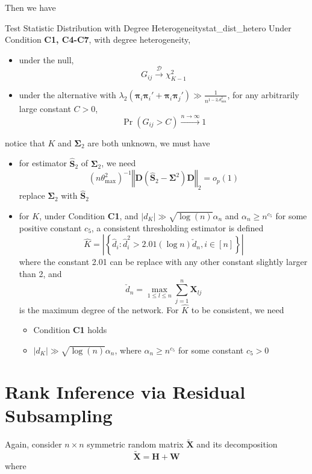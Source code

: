 \documentclass[twoside]{article}
\begin{document}
Then we have 
\begin{theorem}{Test Statistic Distribution with Degree Heterogeneity}{stat_dist_hetero}
    Under Condition \textbf{C1, C4-C7}, with degree heterogeneity, 
    \begin{itemize}
        \item under the null, $$ G_{ij} \xrightarrow{\mathcal{D}} \chi^2_{K-1} $$
        \item under the alternative with $\lambda_2 \left(\boldsymbol{\pi}_i\boldsymbol{\pi}_i' + \boldsymbol{\pi}_i \boldsymbol{\pi}_j'\right) \gg \frac{1}{n^{1-2_c\theta^2_{\min}}}$, for any arbitrarily large constant $C>0$, $$ \Pr(G_{ij}>C)\xrightarrow{n\rightarrow\infty} 1 $$
    \end{itemize}
\end{theorem}
notice that $K$ and $\boldsymbol{\Sigma}_2$ are both unknown, we must have 
\begin{itemize}
    \item for estimator $\hat{\mathbf{S}}_2$ of $\boldsymbol{\Sigma}_2$, we need $$\left(n\theta^2_{\max}\right)^{-1} \left\Vert \mathbf{D}\left(\hat{\mathbf{S}}_2 -\boldsymbol{\Sigma}^2\right)\mathbf{D} \right\Vert _2 = o_p(1)$$ replace $\boldsymbol{\Sigma}_2$ with $\hat{\mathbf{S}}_2$
    \item for $K$, under Condition \textbf{C1}, and $\left\vert d_K \right\vert \gg \sqrt{\log(n)}\alpha_n$ and $\alpha_n\geq n^{c_5}$ for some positive constant $c_5$, a consistent thresholding estimator is defined 
    $$
    \hat{K} = \left\vert \left\{ \hat{d}_i: \hat{d}_i^2 > 2.01(\log n) \check{d}_n,i\in[n] \right\} \right\vert 
    $$
    where the constant 2.01 can be replace with any other constant slightly larger than 2, and $$\check{d}_n = \max_{1\leq l\leq n} \sum^n_{j=1}\mathbf{X}_{lj}$$ is the maximum degree of the network. For $\hat{K}$ to be consistent, we need 
    \begin{itemize}
        \item Condition \textbf{C1} holds
        \item $\left\vert d_K \right\vert \gg \sqrt{\log(n)}\alpha_n$, where $\alpha_n\geq n^{c_5}$ for some constant $c_5>0$
    \end{itemize}
\end{itemize}

\section{Rank Inference via Residual Subsampling}
Again, consider $n\times n$ symmetric random matrix $\tilde{\mathbf{X}}$ and its decomposition 
\begin{equation*}
    \tilde{\mathbf{X}} = \mathbf{H+W}
\end{equation*}
where

\newpage


\end{document}
